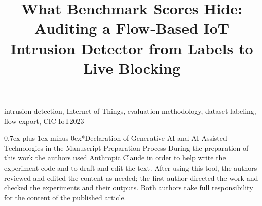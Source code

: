 \documentclass[conference]{IEEEtran}
\makeatletter
\def\section{\@startsection{section}{1}{\z@}{1.5ex plus 1.5ex minus 0.5ex}%
{0.7ex plus 1ex minus 0ex}{\normalfont\normalsize\centering\scshape\bfseries}}%
\makeatother
\begin{document}
\title{What Benchmark Scores Hide: Auditing a Flow-Based IoT Intrusion Detector from Labels to Live Blocking}

\author{
\and
{}
}

\IEEEaftertitletext{\vspace{-1.5\baselineskip}}
\maketitle

\begin{abstract}

\end{abstract}

\begin{IEEEkeywords}
intrusion detection, Internet of Things, evaluation methodology, dataset labeling, flow export, CIC-IoT2023
\end{IEEEkeywords}










\section*{Declaration of Generative AI and AI-Assisted Technologies in the Manuscript Preparation Process}
During the preparation of this work the authors used Anthropic Claude in order to help write the
experiment code and to draft and edit the text. After using this tool, the authors reviewed and
edited the content as needed; the first author directed the work and checked the experiments and
their outputs. Both authors take full responsibility for the content of the published article.



\end{document}
